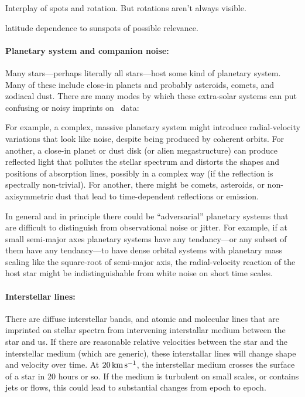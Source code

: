 \documentclass[12pt, fullpage, letterpaper]{article}
\begin{document}
Interplay of spots and rotation. But rotations aren't always visible.

latitude dependence to sunspots of possible relevance.

\paragraph{Planetary system and companion noise:}
Many stars---perhaps literally all stars---host some
kind of planetary system.
Many of these include close-in planets and probably asteroids, comets,
and zodiacal dust.
There are many modes by which these extra-solar systems can put
confusing or noisy imprints on \EPRV\ data:

For example, a complex, massive planetary system might introduce
radial-velocity variations that look like noise, despite being
produced by coherent orbits.
For another, a close-in planet or dust disk (or alien
megastructure) can produce reflected light that pollutes the stellar
spectrum and distorts the shapes and positions of absorption lines,
possibly in a complex way (if the reflection is spectrally
non-trivial).
For another, there might be comets, asteroids, or non-axisymmetric
dust that lead to time-dependent reflections or emission.

In general and in principle there could be ``adversarial'' planetary
systems that are difficult to distinguish from observational noise or
jitter.
For example,
if at small semi-major axes planetary systems have any tendancy---or
any subset of them have any tendancy---to have dense orbital systems
with planetary mass scaling like the square-root of semi-major axis,
the radial-velocity reaction of the host star might be indistinguishable
from white noise on short time scales.

\paragraph{Interstellar lines:}
There are diffuse interstellar bands, and atomic and molecular lines
that are imprinted on stellar spectra from intervening interstallar
medium between the star and us.
If there are reasonable relative velocities between the star and the
interstellar medium (which are generic), these interstallar lines will
change shape and velocity over time.
At $20\,{\mathrm{km\,s^{-1}}}$, the interstellar medium crosses the surface of a star
in 20 hours or so. If the medium is turbulent on small scales, or contains
jets or flows, this
could lead to substantial changes from epoch to epoch.
\end{document}
